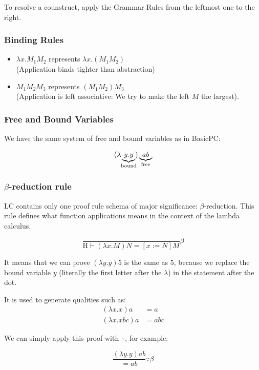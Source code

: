 To resolve a counstruct, apply the Grammar Rules from the leftmost one to the right.

\subsubsection{Binding Rules}
\begin{itemize}
	\item $\lambda x. M_1 M_2$ represents $\lambda x.(M_1 M_2)$ \hfill \\
		(Application binds tighter than abstraction)
	\item $M_1 M_2 M_3$ represents $(M_1 M_2) M_3$ \hfill \\
		(Application is left associative: We try to make the left $M$ the largest).
\end{itemize}

\subsubsection{Free and Bound Variables}

We have the same system of free and bound variables as in BasicPC:

\[
	(\lambda \underbrace{y.y}_{\mathclap{\text{bound}}}) \underbrace{a b}_{\mathclap{\text{free}}}
\]

\subsubsection{$\beta$-reduction rule}

LC contains only one proof rule schema of major significance: $\beta$-reduction.  This rule defines what function applications means in the context of the lambda calculus.

\[
\frac{}{\text{H} \vdash (\lambda x. M ) N = \left[x := N\right] M} \beta
\]

It means that we can prove $(\lambda y.y) 5$ is the same as $5$, because we replace the bound variable $y$ (literally the first letter after the $\lambda$) in the statement after the dot.

It is used to generate qualities such as:
\begin{align*}
(\lambda x.x) a &= a \\
(\lambda x . x b c) a &= a b c
\end{align*}

We can simply apply this proof with $\because$, for example:

\[
	\frac{(\lambda y.y) a b}{= a b} \because \beta
\]

